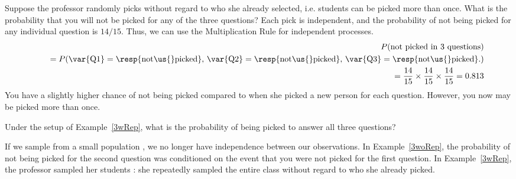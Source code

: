 \begin{examplewrap}
\begin{nexample}{Suppose the professor randomly picks without regard to who she already selected, i.e. students can be picked more than once. What is the probability that you will not be picked for any of the three questions?}\label{3wRep}
Each pick is independent, and the probability of not being picked for any individual question is $14/15$. Thus, we can use the Multiplication Rule for independent processes.
\begin{eqnarray*}
&&P(\text{not picked in 3 questions}) \\
&&\quad = P(\text{\var{Q1}} = \text{\resp{not\us{}picked}, }\text{\var{Q2}} = \text{\resp{not\us{}picked}, }\text{\var{Q3}} = \text{\resp{not\us{}picked}.}) \\
&&\quad = \frac{14}{15}\times\frac{14}{15}\times\frac{14}{15} = 0.813
\end{eqnarray*}
You have a slightly higher chance of not being picked compared to when she picked a new person for each question. However, you now may be picked more than once.
\end{nexample}
\end{examplewrap}

\begin{exercisewrap}
\begin{nexercise}
Under the setup of Example~\ref{3wRep}, what is the probability of being picked to answer all three questions?\footnotemark
\end{nexercise}
\end{exercisewrap}

If we sample from a small population , we no longer have independence between our observations. In Example~\ref{3woRep}, the probability of not being picked for the second question was conditioned on the event that you were not picked for the first question. In Example~\ref{3wRep}, the professor sampled her students : she repeatedly sampled the entire class without regard to who she already picked. 

